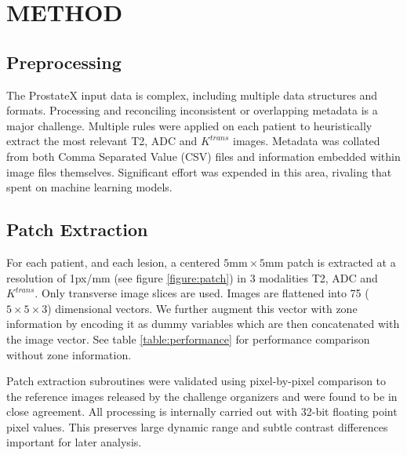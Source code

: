 \documentclass[a4paper]{spie}
\begin{document}
\section{METHOD}

\subsection{Preprocessing}

The ProstateX input data is complex, including multiple data structures and formats. Processing and reconciling inconsistent or overlapping metadata is a major challenge. Multiple rules were applied on each patient to heuristically extract the most relevant T2, ADC and $K^{\mathit{trans}}$ images. Metadata was collated from both Comma Separated Value (CSV) files and information embedded within image files themselves. Significant effort was expended in this area, rivaling that spent on machine learning models.

\subsection{Patch Extraction}

For each patient, and each lesion, a centered $5\text{mm} \times 5\text{mm}$ patch is extracted at a resolution of 1px/mm (see figure \ref{figure:patch}) in 3 modalities T2, ADC and $K^{\mathit{trans}}$. Only transverse image slices are used. Images are flattened into 75 ($5 \times 5 \times 3$) dimensional vectors. We further augment this vector with zone information by encoding it as dummy variables\cite{Hastie2009} which are then concatenated with the image vector. See table \ref{table:performance} for performance comparison without zone information.

Patch extraction subroutines were validated using pixel-by-pixel comparison to the reference images released by the challenge organizers and were found to be in close agreement. All processing is internally carried out with 32-bit floating point pixel values. This preserves large dynamic range and subtle contrast differences important for later analysis.
\end{document}
